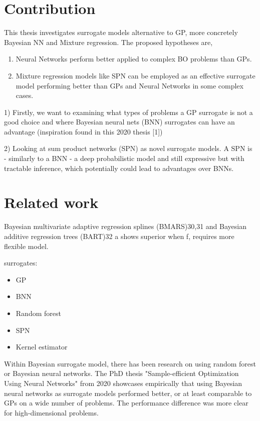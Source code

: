 \section{Contribution}
This thesis investigates surrogate models alternative to GP, more concretely Bayesian NN
and Mixture regression. The proposed hypotheses are, 

\begin{enumerate}
    \item Neural Networks perform better applied to complex BO problems than GPs.
    \item Mixture regression models like SPN can be employed as an effective surrogate model
    performing better than GPs and Neural Networks in some complex cases. 
\end{enumerate}

1)     Firstly, we want to examining what types of problems a GP surrogate is not a good choice and
where Bayesian neural nets (BNN) surrogates can have an advantage (inspiration found in this 2020
thesis [1])
    
2) Looking at sum product networks (SPN) as novel surrogate models. A SPN is - similarly to a BNN
- a deep probabilistic model and still expressive but with tractable inference, which potentially
could lead to advantages over BNNs. 

\section{Related work}
Bayesian multivariate adaptive
regression splines (BMARS)30,31 and Bayesian additive regression
trees (BART)32 a
shows superior when f, requires more flexible model. 

surrogates: 
\begin{itemize}
    \item GP
    \item BNN
    \item Random forest
    \item SPN
    \item Kernel estimator
\end{itemize}

Within Bayesian surrogate model, there has been research on using random forest or Bayesian neural 
networks. The PhD thesis "Sample-efficient Optimization Using Neural Networks" from 2020 \cite{PhDthesis}
showcases empirically that using Bayesian neural networks as surrogate models performed better,
or at least comparable to GPs on a wide number of problems. The performance difference was more
clear for high-dimensional problems. 

